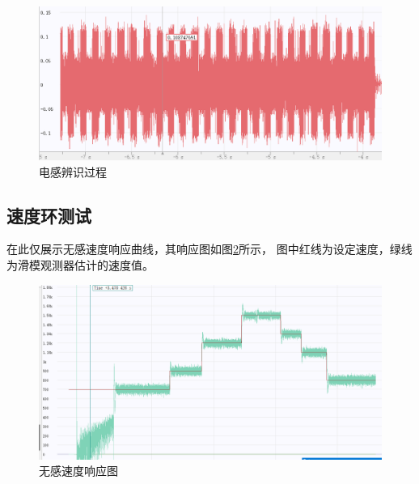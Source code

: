 ﻿\documentclass[12pt,a4paper]{article}
\begin{document}
\begin{figure}[!htbp]
  \centering
  \includegraphics[width=\linewidth]{picture/辨识3.png}
  \caption{电感辨识过程}
  \label{test101}
\end{figure}

\subsection{速度环测试}
在此仅展示无感速度响应曲线，其响应图如图\ref{test102}所示，
图中红线为设定速度，绿线为滑模观测器估计的速度值。
\begin{figure}[!htbp]
  \centering
  \includegraphics[width=\linewidth]{picture/无感速度波形图.png}
  \caption{无感速度响应图}
  \label{test102}
\end{figure}


\end{document}
